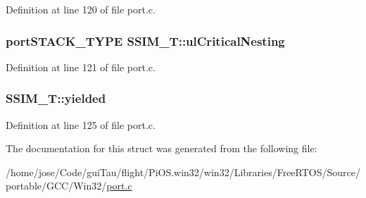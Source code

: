 Definition at line 120 of file port.\-c.

\hypertarget{struct_s_s_i_m___t_ac257dec6e7fce94889583a6867cdd7c6}{
\subsubsection[{ul\-Critical\-Nesting}]{\setlength{\rightskip}{0pt plus 5cm}port\-S\-T\-A\-C\-K\-\_\-\-T\-Y\-P\-E S\-S\-I\-M\-\_\-\-T\-::ul\-Critical\-Nesting}}\label{struct_s_s_i_m___t_ac257dec6e7fce94889583a6867cdd7c6}


Definition at line 121 of file port.\-c.

\hypertarget{struct_s_s_i_m___t_aa951f32f4bd9ed9194b75e31c8a98a48}{
\subsubsection[{yielded}]{ S\-S\-I\-M\-\_\-\-T\-::yielded}}\label{struct_s_s_i_m___t_aa951f32f4bd9ed9194b75e31c8a98a48}


Definition at line 125 of file port.\-c.



The documentation for this struct was generated from the following file\-:\begin{DoxyCompactItemize}
\item 
/home/jose/\-Code/gui\-Tau/flight/\-Pi\-O\-S.\-win32/win32/\-Libraries/\-Free\-R\-T\-O\-S/\-Source/portable/\-G\-C\-C/\-Win32/\hyperlink{win32_2win32_2_libraries_2_free_r_t_o_s_2_source_2portable_2_g_c_c_2_win32_2port_8c}{port.\-c}\end{DoxyCompactItemize}
